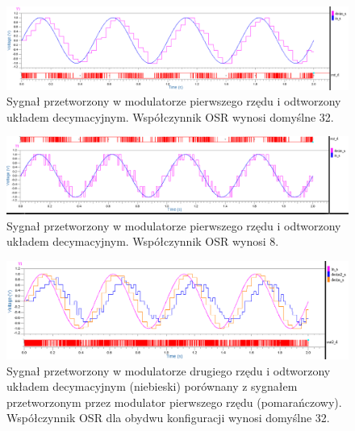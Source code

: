 \documentclass[13pt, a4paper, twoside]{mwart}
\begin{document}
\begin{figure}[H]
	\centering
  \includegraphics[width=0.9\linewidth]{inv/sigma_delta_decymator.png}
  \caption{Sygnał przetworzony w modulatorze pierwszego rzędu i odtworzony układem decymacyjnym. Współczynnik OSR wynosi domyślne 32.}
\end{figure}

\begin{figure}[H]
	\centering
  \includegraphics[width=0.9\linewidth]{inv/sigma_delta_decymator_osr8.png}
  \caption{Sygnał przetworzony w modulatorze pierwszego rzędu i odtworzony układem decymacyjnym. Współczynnik OSR wynosi 8.}
\end{figure}

\begin{figure}[H]
	\centering
  \includegraphics[width=0.9\linewidth]{inv/sigma_delta_2_rzedu_porownanie.png}
  \caption{Sygnał przetworzony w modulatorze drugiego rzędu i odtworzony układem decymacyjnym (niebieski) porównany z sygnałem przetworzonym przez modulator pierwszego rzędu (pomarańczowy). Współczynnik OSR dla obydwu konfiguracji wynosi domyślne 32.}
\end{figure}

\end{document}
